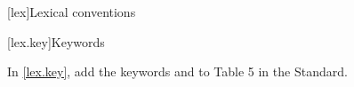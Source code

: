 
[lex]{Lexical conventions}

\setcounter{section}{10}
[lex.key]{Keywords}

In \ref{lex.key}, add the keywords  and
 to Table 5 in the \Cpp Standard.

